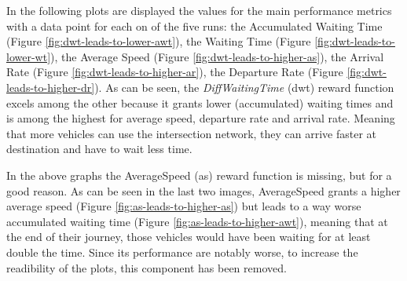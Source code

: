 In the following plots are displayed the values for the main performance metrics with a data point for each on of the five runs: the Accumulated Waiting Time (Figure \ref{fig:dwt-leads-to-lower-awt}), the Waiting Time (Figure \ref{fig:dwt-leads-to-lower-wt}), the Average Speed (Figure \ref{fig:dwt-leads-to-higher-as}), the Arrival Rate (Figure \ref{fig:dwt-leads-to-higher-ar}), the Departure Rate (Figure \ref{fig:dwt-leads-to-higher-dr}).
As can be seen, the \textit{DiffWaitingTime} (dwt) reward function excels among the other because it grants lower (accumulated) waiting times and is among the highest for average speed, departure rate and arrival rate.
Meaning that more vehicles can use the intersection network, they can arrive faster at destination and have to wait less time.


In the above graphs the AverageSpeed (as) reward function is missing, but for a good reason.
As can be seen in the last two images, AverageSpeed grants a higher average speed (Figure \ref{fig:as-leads-to-higher-as}) but leads to a way worse accumulated waiting time (Figure \ref{fig:as-leads-to-higher-awt}), meaning that at the end of their journey, those vehicles would have been waiting for at least double the time.
Since its performance are notably worse, to increase the readibility of the plots, this component has been removed.


